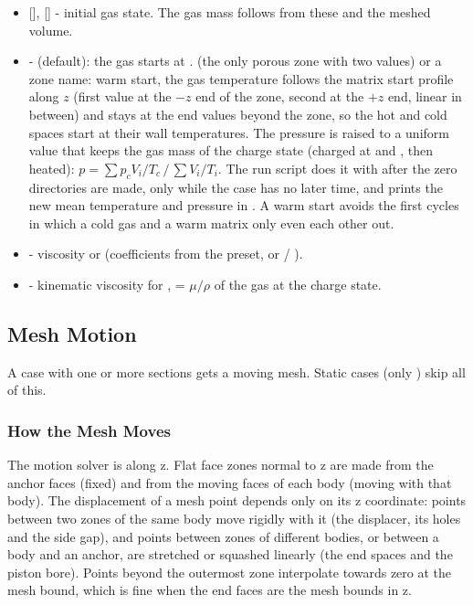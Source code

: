 \begin{itemize}
    \item {} [],  [] - initial gas state. The gas mass follows from these and the meshed volume.
    \item {} -  (default): the gas starts at .  (the only porous zone with two  values) or a  zone name: warm start, the gas temperature follows the matrix start profile along $z$ (first  value at the $-z$ end of the zone, second at the $+z$ end, linear in between) and stays at the end values beyond the zone, so the hot and cold spaces start at their wall temperatures. The pressure is raised to a uniform value that keeps the gas mass of the charge state (charged at  and , then heated): $p = \sum p_c V_i/T_c \,/\, \sum V_i/T_i$. The run script does it with  after the zero directories are made, only while the case has no later time, and prints the new mean temperature and pressure in . A warm start avoids the first cycles in which a cold gas and a warm matrix only even each other out.
    \item {} -  viscosity or  (coefficients from the preset, or  / ).
    \item {} - kinematic viscosity for ,  = $\mu/\rho$ of the gas at the charge state.
\end{itemize}

\subsection{Mesh Motion}\label{sec:motion}
A case with one or more  sections gets a moving mesh. Static cases (only ) skip all of this.

\subsubsection{How the Mesh Moves}
The motion solver is  along z. Flat face zones normal to z are made from the anchor faces (fixed) and from the moving faces of each body (moving with that body). The displacement of a mesh point depends only on its z coordinate: points between two zones of the same body move rigidly with it (the displacer, its holes and the side gap), and points between zones of different bodies, or between a body and an anchor, are stretched or squashed linearly (the end spaces and the piston bore). Points beyond the outermost zone interpolate towards zero at the mesh bound, which is fine when the end faces are the mesh bounds in z.

